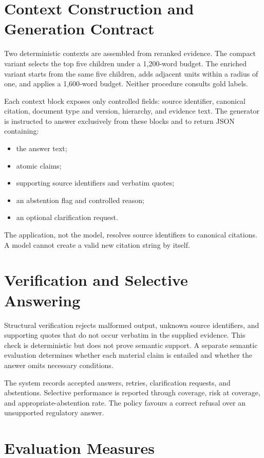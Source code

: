\section{Context Construction and Generation Contract}

Two deterministic contexts are assembled from reranked evidence. The compact variant selects the top five children under a 1,200-word budget. The enriched variant starts from the same five children, adds adjacent units within a radius of one, and applies a 1,600-word budget. Neither procedure consults gold labels.

Each context block exposes only controlled fields: source identifier, canonical citation, document type and version, hierarchy, and evidence text. The generator is instructed to answer exclusively from these blocks and to return JSON containing:

\begin{itemize}
  \item the answer text;
  \item atomic claims;
  \item supporting source identifiers and verbatim quotes;
  \item an abstention flag and controlled reason;
  \item an optional clarification request.
\end{itemize}

The application, not the model, resolves source identifiers to canonical citations. A model cannot create a valid new citation string by itself.

\section{Verification and Selective Answering}

Structural verification rejects malformed output, unknown source identifiers, and supporting quotes that do not occur verbatim in the supplied evidence. This check is deterministic but does not prove semantic support. A separate semantic evaluation determines whether each material claim is entailed and whether the answer omits necessary conditions.

The system records accepted answers, retries, clarification requests, and abstentions. Selective performance is reported through coverage, risk at coverage, and appropriate-abstention rate. The policy favours a correct refusal over an unsupported regulatory answer.

\section{Evaluation Measures}

